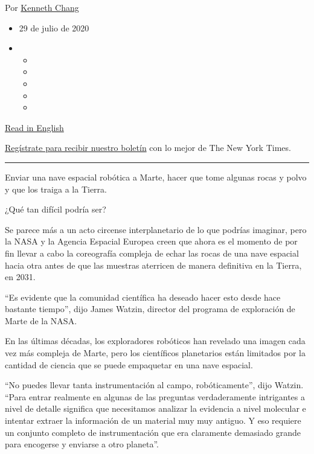 Por \href{https://www.nytimes3xbfgragh.onion/by/kenneth-chang}{Kenneth
Chang}

\begin{itemize}
\item
  29 de julio de 2020
\item
  \begin{itemize}
  \item
  \item
  \item
  \item
  \item
  \end{itemize}
\end{itemize}

\href{https://www.nytimes3xbfgragh.onion/2020/07/28/science/mars-sample-return-mission.html}{Read
in English}

\href{https://www.nytimes3xbfgragh.onion/newsletters/el-times}{Regístrate
para recibir nuestro boletín} con lo mejor de The New York Times.

\begin{center}\rule{0.5\linewidth}{\linethickness}\end{center}

Enviar una nave espacial robótica a Marte, hacer que tome algunas rocas
y polvo y que los traiga a la Tierra.

¿Qué tan difícil podría ser?

Se parece más a un acto circense interplanetario de lo que podrías
imaginar, pero la NASA y la Agencia Espacial Europea creen que ahora es
el momento de por fin llevar a cabo la coreografía compleja de echar las
rocas de una nave espacial hacia otra antes de que las muestras
aterricen de manera definitiva en la Tierra, en 2031.

``Es evidente que la comunidad científica ha deseado hacer esto desde
hace bastante tiempo'', dijo James Watzin, director del programa de
exploración de Marte de la NASA.

En las últimas décadas, los exploradores robóticos han revelado una
imagen cada vez más compleja de Marte, pero los científicos planetarios
están limitados por la cantidad de ciencia que se puede empaquetar en
una nave espacial.

``No puedes llevar tanta instrumentación al campo, robóticamente'', dijo
Watzin. ``Para entrar realmente en algunas de las preguntas
verdaderamente intrigantes a nivel de detalle significa que necesitamos
analizar la evidencia a nivel molecular e intentar extraer la
información de un material muy muy antiguo. Y eso requiere un conjunto
completo de instrumentación que era claramente demasiado grande para
encogerse y enviarse a otro planeta''.

